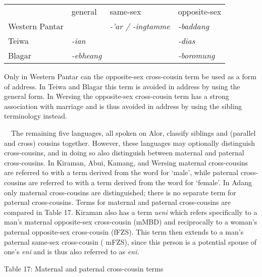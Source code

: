 \begin{center}
\tablehead{}
\begin{supertabular}{m{1.1900599in}m{1.1170598in}m{1.2281599in}m{1.1268599in}}
 &
general &
same-sex &
opposite-sex\\
Western Pantar &
 &
\textit{{}-{\textquoteright}ar / -ingtamme} &
\textit{{}-baddang}\\
Teiwa &
\textit{{}-ian} &
 &
\textit{{}-dias}\\
Blagar &
\textit{{}-ebheang} &
 &
\textit{{}-boromung}\\
\end{supertabular}
\end{center}
Only in Western Pantar can the opposite-sex cross-cousin term be used as a form of address. In Teiwa and Blagar this term is avoided in address by using the general form. In Wersing the opposite-sex cross-cousin term has a strong association with marriage and is thus avoided in address by using the sibling terminology instead. 

\ \ The remaining five languages, all spoken on Alor, classify siblings and (parallel and cross) cousins together. However, these languages may optionally distinguish cross-cousins, and in doing so also distinguish between maternal and paternal cross-cousins. In Kiraman, Abui, Kamang, and Wersing maternal cross-cousins are referred to with a term derived from the word for {\textquoteleft}male{\textquoteright}, while paternal cross-cousins are referred to with a term derived from the word for {\textquoteleft}female{\textquoteright}. In Adang only maternal cross-cousins are distinguished; there is no separate term for paternal cross-cousins. Terms for maternal and paternal cross-cousins are compared in Table 17. Kiraman also has a term \textit{ueni }which refers specifically to a man{\textquoteright}s maternal opposite-sex cross-cousin (mMBD) and reciprocally to a woman{\textquoteright}s paternal opposite-sex cross-cousin (fFZS). This term then extends to a man{\textquoteright}s paternal same-sex cross-cousin (
mFZS), since this person is a potential spouse of one{\textquoteright}s \textit{eni} and is thus also referred to as \textit{eni. }

{\centering
Table 17: Maternal and paternal cross-cousin terms
\par}

